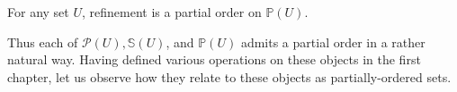 For any set $U$, refinement is a partial order on $\mathbb{P}(U)$.

Thus each of $\mathcal{P}(U), \mathbb{S}(U)$, and $\mathbb{P}(U)$ admits a partial order in a rather natural way. Having defined various operations on these objects in the first chapter, let us observe how they relate to these objects as partially-ordered sets.
